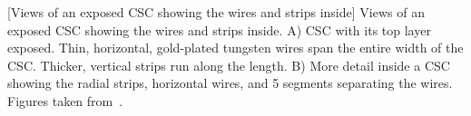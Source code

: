 \begin{multiFigure}
    \centering
        [Views of an exposed CSC showing the wires and strips inside]
        {Views of an exposed CSC showing the wires and strips inside.
        \;A) CSC with its top layer exposed.
        Thin, horizontal, gold-plated tungsten wires span the entire width of the CSC. 
        Thicker, vertical strips run along the length.
        \;B) More detail inside a CSC showing the radial strips, horizontal wires, and 5 segments separating the wires.
        Figures taken from~\cite{collaboration_cms_2008}.
        }
    \label{fig:csc_guts}
\end{multiFigure}

